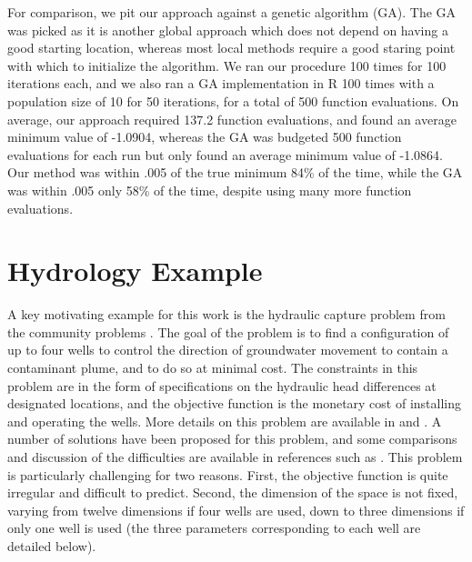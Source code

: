 \documentclass[12pt]{article}
\begin{document}
For comparison, we pit our approach against a genetic algorithm (GA).
The GA was picked as it is another global approach which does not
depend on having a good starting location, whereas most local methods
require a good staring point with which to initialize the algorithm.
We ran our procedure 100 times for 100 iterations each, and we also
ran a GA implementation in R \cite{genalg} 100 times with a
population size of 10 for 50 iterations, for a total of 500 function
evaluations.  On average, our approach required 137.2 function
evaluations, and found an average minimum value of -1.0904, whereas
the GA was budgeted 500 function evaluations for each run but only
found an average minimum value of -1.0864.  Our method was within .005
of the true minimum 84\% of the time, while the GA was within .005
only 58\% of the time, despite using many more function evaluations.


\section{Hydrology Example} \label{sec:hydro}

A key motivating example for this work is the hydraulic capture
problem from the community problems \cite{maye:kell:mill:2002}.  The
goal of the problem is to find a configuration of up to four wells to
control the direction of groundwater movement to contain a contaminant
plume, and to do so at minimal cost.  The constraints in this problem
are in the form of specifications on the hydraulic head differences at
designated locations, and the objective function is the monetary cost
of installing and operating the wells.  More details on this problem
are available in \cite{maye:kell:mill:2002} and
\cite{fowl:kell:kees:mill:2004}.  A number of solutions have been
proposed for this problem, and some comparisons and discussion of the
difficulties are available in references such as
\cite{fowl:2008,gray:fowl:grif:2009,HemkerMINP}.  This problem is
particularly challenging for two reasons.  First, the objective
function is quite irregular and difficult to predict.  Second, the
dimension of the space is not fixed, varying from twelve dimensions if
four wells are used, down to three dimensions if only one well is used
(the three parameters corresponding to each well are detailed below).
\end{document}
